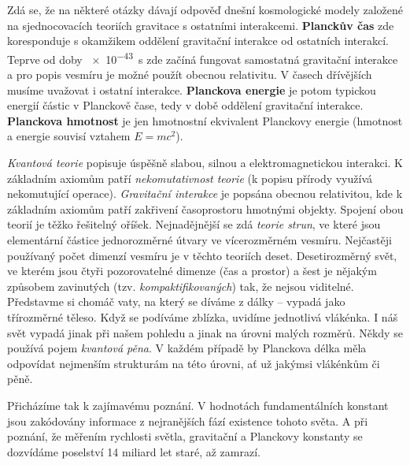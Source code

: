       Zdá se, že na některé otázky dávají odpověď dnešní kosmologické modely založené na
      sjednocovacích teoriích gravitace s ostatními interakcemi. \textbf{Planckův čas} zde
      koresponduje s okamžikem oddělení gravitační interakce od ostatních interakcí. Teprve od doby
      \SI{e-43}{\s} zde začíná fungovat samostatná gravitační interakce a pro popis vesmíru je možné
      použít obecnou relativitu. V časech dřívějších musíme uvažovat i ostatní interakce.
      \textbf{Planckova energie} je potom typickou energií částic v Planckově čase, tedy v době
      oddělení gravitační interakce. \textbf{Planckova hmotnost} je jen hmotnostní ekvivalent
      Planckovy energie (hmotnost a energie souvisí vztahem \(E = mc^2\)).
      
      \emph{Kvantová teorie} popisuje úspěšně slabou, silnou a elektromagnetickou interakci. K
      základním axiomům patří \emph{nekomutativnost teorie} (k popisu přírody využívá nekomutující
      operace). \emph{Gravitační interakce} je popsána obecnou relativitou, kde k základním axiomům
      patří zakřivení časoprostoru hmotnými objekty. Spojení obou teorií je těžko řešitelný oříšek.
      Nejnadějnější se zdá \emph{teorie strun}, ve které jsou elementární částice jednorozměrné
      útvary ve vícerozměrném vesmíru. Nejčastěji používaný počet dimenzí vesmíru je v těchto
      teoriích deset. Desetirozměrný svět, ve kterém jsou čtyři pozorovatelné dimenze (čas a
      prostor) a šest je nějakým způsobem zavinutých (tzv. \emph{kompaktifikovaných}) tak, že nejsou
      viditelné. Představme si chomáč vaty, na který se díváme z dálky – vypadá jako třírozměrné
      těleso. Když se podíváme zblízka, uvidíme jednotlivá vlákénka. I náš svět vypadá jinak při
      našem pohledu a jinak na úrovni malých rozměrů. Někdy se používá pojem \emph{kvantová pěna}. V
      každém případě by Planckova délka měla odpovídat nejmenším strukturám na této úrovni, ať už
      jakýmsi vlákénkům či pěně.
      
      Přicházíme tak k zajímavému poznání. V hodnotách fundamentálních konstant jsou zakódovány
      informace z nejranějších fází existence tohoto světa. A při poznání, že měřením rychlosti
      světla, gravitační a Planckovy konstanty se dozvídáme poselství 14 miliard let staré, až
      zamrazí.

      

